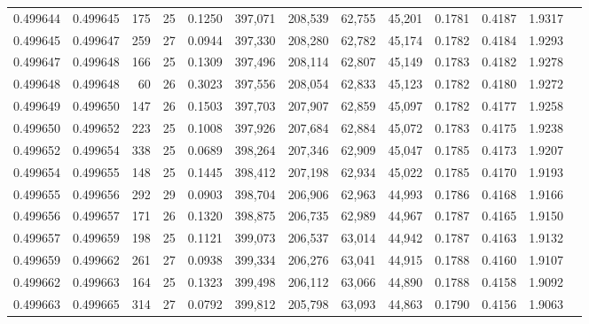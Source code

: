 \begin{tabular}{rrrrrrrrrrrrr}
0.499644 & 0.499645 & 175 &  25 &                                     0.1250 & 397,071 & 208,539 &  62,755 &  45,201 & 0.1781 & 0.4187 & 1.9317 \\
0.499645 & 0.499647 & 259 &  27 &                                     0.0944 & 397,330 & 208,280 &  62,782 &  45,174 & 0.1782 & 0.4184 & 1.9293 \\
0.499647 & 0.499648 & 166 &  25 &                                     0.1309 & 397,496 & 208,114 &  62,807 &  45,149 & 0.1783 & 0.4182 & 1.9278 \\
0.499648 & 0.499648 &  60 &  26 &                                     0.3023 & 397,556 & 208,054 &  62,833 &  45,123 & 0.1782 & 0.4180 & 1.9272 \\
0.499649 & 0.499650 & 147 &  26 &                                     0.1503 & 397,703 & 207,907 &  62,859 &  45,097 & 0.1782 & 0.4177 & 1.9258 \\
0.499650 & 0.499652 & 223 &  25 &                                     0.1008 & 397,926 & 207,684 &  62,884 &  45,072 & 0.1783 & 0.4175 & 1.9238 \\
0.499652 & 0.499654 & 338 &  25 &                                     0.0689 & 398,264 & 207,346 &  62,909 &  45,047 & 0.1785 & 0.4173 & 1.9207 \\
0.499654 & 0.499655 & 148 &  25 &                                     0.1445 & 398,412 & 207,198 &  62,934 &  45,022 & 0.1785 & 0.4170 & 1.9193 \\
0.499655 & 0.499656 & 292 &  29 &                                     0.0903 & 398,704 & 206,906 &  62,963 &  44,993 & 0.1786 & 0.4168 & 1.9166 \\
0.499656 & 0.499657 & 171 &  26 &                                     0.1320 & 398,875 & 206,735 &  62,989 &  44,967 & 0.1787 & 0.4165 & 1.9150 \\
0.499657 & 0.499659 & 198 &  25 &                                     0.1121 & 399,073 & 206,537 &  63,014 &  44,942 & 0.1787 & 0.4163 & 1.9132 \\
0.499659 & 0.499662 & 261 &  27 &                                     0.0938 & 399,334 & 206,276 &  63,041 &  44,915 & 0.1788 & 0.4160 & 1.9107 \\
0.499662 & 0.499663 & 164 &  25 &                                     0.1323 & 399,498 & 206,112 &  63,066 &  44,890 & 0.1788 & 0.4158 & 1.9092 \\
0.499663 & 0.499665 & 314 &  27 &                                     0.0792 & 399,812 & 205,798 &  63,093 &  44,863 & 0.1790 & 0.4156 & 1.9063 \\

\end{tabular}
